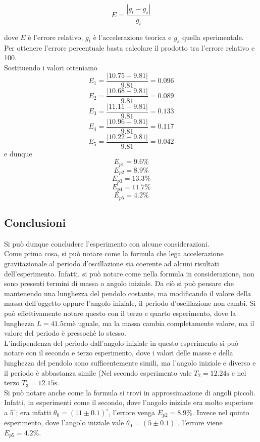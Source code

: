 \documentclass{article}
\begin{document}
$$E = \frac{|g_t - g_s|}{g_t}$$

dove $E$ è l'errore relativo, $g_t$ è l'accelerazione teorica e $g_s$ quella sperimentale.\\
Per ottenere l'errore percentuale basta calcolare il prodotto tra l'errore relativo e 100.\\
Sostituendo i valori otteniamo
$$E_1 = \frac{|10.75 - 9.81|}{9.81} = 0.096$$
$$E_2 = \frac{|10.68 - 9.81|}{9.81} = 0.089$$
$$E_3 = \frac{|11.11 - 9.81|}{9.81} = 0.133$$
$$E_4 = \frac{|10.96 - 9.81|}{9.81} = 0.117$$
$$E_5 = \frac{|10.22 - 9.81|}{9.81} = 0.042$$
e dunque
$$E_{p1} = 9.6\%$$
$$E_{p2} = 8.9\%$$
$$E_{p3} = 13.3\%$$
$$E_{p4} = 11.7\%$$
$$E_{p5} = 4.2\%$$

\subsection{Conclusioni}
Si può dunque concludere l'esperimento con alcune considerazioni.\\
Come prima cosa, si può notare come la formula che lega accelerazione gravitazionale al periodo d'oscillazione sia coerente ad alcuni risultati dell'esperimento. Infatti, si può notare come nella formula in considerazione, non sono presenti termini di massa o angolo iniziale. Da ciò si può pensare che mantenendo una lunghezza del pendolo costante, ma modificando il valore della massa dell'oggetto oppure l'angolo iniziale, il periodo d'oscillazione non cambi. Si può effettivamente notare questo con il terzo e quarto esperimento, dove la lunghezza $L = 41.5\mathrm{cm}$è uguale, ma la massa cambia completamente valore, ma il valore del periodo è pressochè lo stesso.\\
L'indipendenza del periodo dall'angolo iniziale in questo esperimento si può notare con il secondo e terzo esperimento, dove i valori delle masse e della lunghezza del pendolo sono sufficentemente simili, ma l'angolo iniziale e diverso e il periodo è abbastanza simile (Nel secondo esperimento vale $T_2 = 12.24\mathrm{s}$ e nel terzo $T_3 = 12.15\mathrm{s}$.\\
Si può notare anche come la formula si trovi in approssimazione di angoli piccoli. Infatti, in esperimenti come il secondo, dove l'angolo iniziale era molto superiore a $5^\circ$; era infatti $\theta_0 = (11 \pm 0.1)^\circ$, l'errore venga $E_{p2} = 8.9\%$. Invece nel quinto esperimento, dove l'angolo iniziale vale $\theta_0 = (5 \pm 0.1)^\circ$, l'errore viene $E_{p5} = 4.2\%$.\\
\end{document}
